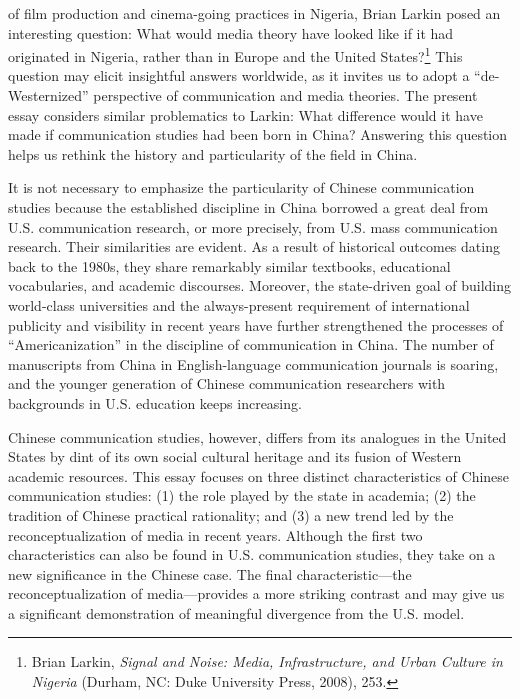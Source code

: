 \documentclass{tufte-handout}
\begin{document}
\begin{titlepage}
 of film production and cinema-going practices in
Nigeria, Brian Larkin posed an interesting question: What would media
theory have looked like if it had originated in Nigeria, rather than in
Europe and the United States?\footnote{Brian Larkin, \emph{Signal and
  Noise: Media, Infrastructure, and Urban Culture in Nigeria} (Durham,
  NC: Duke University Press, 2008), 253.} This question may elicit
insightful answers worldwide, as it invites us to adopt a
``de-Westernized'' perspective of communication and media theories. The
present essay considers similar problematics to Larkin: What difference
would it have made if communication studies had been born in China?
Answering this question helps us rethink the history and particularity
of the field in China.

It is not necessary to emphasize the particularity of Chinese
communication studies because the established discipline in China
borrowed a great deal from U.S. communication research, or more
precisely, from U.S. mass communication research. Their similarities are
evident. As a result of historical outcomes dating back to the 1980s,
they share remarkably similar textbooks, educational vocabularies, and
academic discourses. Moreover, the state-driven goal of building
world-class universities and the always-present requirement of
international publicity and visibility in recent years have further
strengthened the processes of ``Americanization'' in the discipline of
communication in China. The number of manuscripts from China in
English-language communication journals is soaring, and the younger
generation of Chinese communication researchers with backgrounds in U.S.
education keeps increasing.

\enlargethispage{3\baselineskip}

\vspace*{2em}





 \end{titlepage}


Chinese communication studies, however, differs from its analogues in
the United States by dint of its own social cultural heritage and its
fusion of Western academic resources. This essay focuses on three
distinct characteristics of Chinese communication studies: (1) the role
played by the state in academia; (2) the tradition of Chinese practical
rationality; and (3) a new trend led by the reconceptualization of media
in recent years. Although the first two characteristics can also be
found in U.S. communication studies, they take on a new significance in
the Chinese case. The final characteristic---the reconceptualization of
media---provides a more striking contrast and may give us a significant
demonstration of meaningful divergence from the U.S. model.
\end{document}
